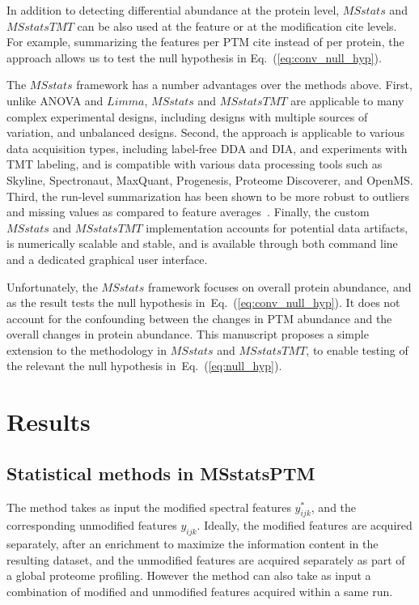 \documentclass[mcp]{article}
\numberwithin{table}{section}
\def\eqref#1{Eq.~(\ref{eq:#1})}
\begin{document}
In addition to detecting differential abundance at the protein level, $MSstats$ and $MSstatsTMT$ can be also used at the feature or at the modification cite levels. For example, summarizing the features per PTM cite instead of per protein, the approach allows us to test the null hypothesis in \eqref{conv_null_hyp}.

The $MSstats$ framework has a number advantages over the methods above. 
First, unlike ANOVA and $Limma$, $MSstats$ and $MSstatsTMT$ are applicable to many complex experimental designs, including designs with multiple sources of variation, and unbalanced designs. 
Second, the approach is applicable to various data acquisition types, including label-free DDA and DIA, and experiments with TMT labeling, and is compatible with various data processing tools such as Skyline, Spectronaut, MaxQuant, Progenesis, Proteome Discoverer, and OpenMS. 
Third, the run-level summarization has been shown to be more robust to outliers and missing values as compared to feature averages~\cite{Choi:2014}. 
Finally, the custom $MSstats$ and $MSstatsTMT$ implementation accounts for potential data artifacts, is numerically scalable and stable, and is available through both command line and a dedicated graphical user interface.

Unfortunately, the $MSstats$ framework focuses on overall protein abundance, and as the result tests the null hypothesis in~\eqref{conv_null_hyp}. It does not account for the confounding between the changes in PTM abundance and the overall changes in protein abundance. This manuscript proposes a simple extension to the methodology in $MSstats$ and $MSstatsTMT$, to enable testing of the relevant the null hypothesis in~\eqref{null_hyp}.

\section{Results}

\subsection*{Statistical methods in MSstatsPTM}
\label{sec:adjustment_summary}

\medskip {}

\medskip \noindent
The method takes as input the modified spectral features $y_{ijk}^{\ast}$, and the corresponding unmodified features $y_{ijk}$. Ideally, the modified features are acquired separately, after an enrichment to maximize the information content in the resulting dataset, and the unmodified features are acquired separately as part of a global proteome profiling. However the method can also take as input a combination of modified and unmodified features acquired within a same run. 
\end{document}
